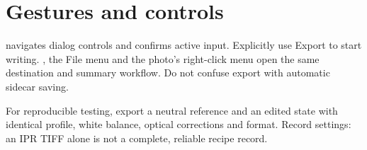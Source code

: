 
\section{Gestures and controls}
 navigates dialog controls and  confirms active input.
Explicitly use Export to start writing. , the File menu and
the photo's right-click menu open the same destination and summary workflow.
Do not confuse export with automatic sidecar saving.

For reproducible testing, export a neutral reference and an edited state
with identical profile, white balance, optical corrections and format.
Record settings: an IPR TIFF alone is not a complete, reliable recipe record.
